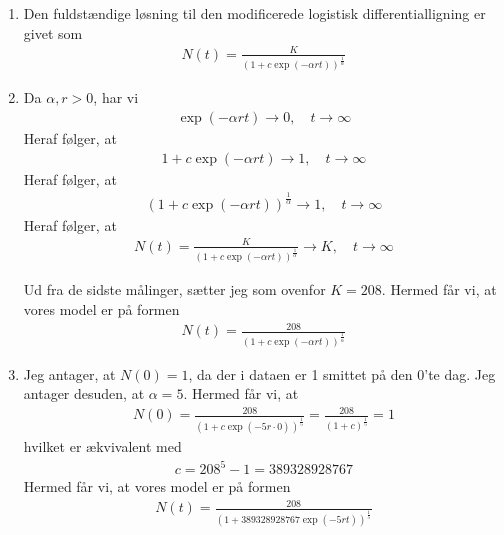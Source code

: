 \documentclass[12pt]{article}
\begin{document}
\begin{enumerate}
\item Den fuldstændige løsning til den modificerede logistisk differentialligning er givet som
\begin{align}
N(t) = \frac{K}{(1+c\exp(-\alpha r t))^\frac{1}{\alpha}}
\end{align}

\item Da $\alpha, r >0$, har vi
\begin{align}
\exp(-\alpha r t) \to 0, \quad t\to \infty
\end{align}
Heraf følger, at
\begin{align}
1 + c\exp(-\alpha r t) \to 1, \quad t\to \infty
\end{align}
Heraf følger, at 
\begin{align}
(1+c\exp(-\alpha r t))^\frac{1}{\alpha} \to 1, \quad t\to \infty
\end{align}
Heraf følger, at
\begin{align}
N(t) = \frac{K}{(1+c\exp(-\alpha r t))^\frac{1}{\alpha}} \to K, \quad t\to \infty
\end{align}

Ud fra de sidste målinger, sætter jeg som ovenfor $K=208$. Hermed får vi, at vores model er på formen
\begin{align}
N(t) = \frac{208}{(1+c\exp(-\alpha r t))^\frac{1}{\alpha}}
\end{align}

\item Jeg antager, at $N(0)=1$, da der i dataen er 1 smittet på den 0'te dag. Jeg antager desuden, at $\alpha=5$. Hermed får vi, at 
\begin{align}
N(0) = \frac{208}{(1 + c\exp(-5 r\cdot 0) )^\frac{1}{5}} = \frac{208}{(1 + c)^\frac{1}{5}} = 1
\end{align}
hvilket er ækvivalent med
\begin{align}
c = 208^5 -1 = 389328928767
\end{align}
Hermed får vi, at vores model er på formen
\begin{align}
N(t) = \frac{208}{(1+389328928767\exp(-5 r t))^\frac{1}{5}}
\end{align}


\end{enumerate}
\end{document}
